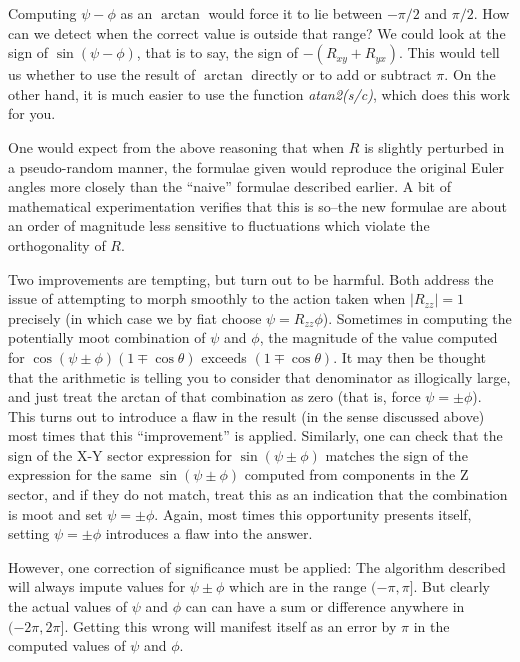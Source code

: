 \documentclass[twoside,12pt]{article}
\begin{document}
Computing $\psi - \phi $ as an $\arctan$ would force it to lie between $-\pi/2$
and $\pi/2$.  How can we detect when the correct value is outside that range?
We could look at the sign of $\sin (\psi - \phi)$, 
that is to say, the sign of $-(R_{xy} + R_{yx})$.  This would tell us
whether to use the result of $\arctan$ directly or to add or subtract $\pi$.
On the other hand, it is much easier to use the function {\em atan2(s/c)},
which does this work for you.

One would expect from the above reasoning that when $R$ is slightly perturbed
in a pseudo-random manner,
the formulae given would reproduce the original Euler angles more closely than 
the ``naive'' formulae described earlier.  A bit of mathematical experimentation
verifies that this is so--the new formulae are about an order of magnitude
less sensitive to fluctuations which violate the orthogonality of $R$.

Two improvements are tempting, but turn out to be harmful.  Both address the
issue of attempting to morph smoothly to the action taken when $|R_{zz}| = 1$
precisely (in which case we by fiat choose $\psi = R_{zz} \phi$).   Sometimes
in computing the potentially moot combination of $\psi$ and $\phi$, 
the magnitude of the value computed for 
$\cos (\psi \pm \phi) (1 \mp \cos \theta)$ exceeds $(1 \mp \cos \theta)$.  
It may then be thought that the arithmetic is telling you to consider that 
denominator as illogically large, and just treat the arctan of that 
combination as zero (that is, force $\psi = \pm \phi$).  This turns out to
introduce a flaw in the result (in the sense discussed above) most times that
this ``improvement'' is applied.  Similarly, one can check that the sign of the 
X-Y sector expression for $\sin(\psi \pm \phi)$ matches the sign of the
expression for the same $\sin(\psi \pm \phi)$ computed from components in the Z
sector, and if they do not match, treat this as an indication that the
combination is moot and set $\psi = \pm \phi$.  Again, most times this
opportunity presents itself, setting $\psi = \pm \phi$ introduces a flaw 
into the answer.  

However, one correction of significance must be applied:
The algorithm described will always impute values for $\psi \pm \phi$ 
which are in the range $(-\pi,\pi]$.  But clearly the actual values of 
$\psi$ and $\phi$ can can have a sum or difference anywhere in $(-2\pi,2\pi]$.
Getting this wrong will manifest itself as an error by $\pi$ in the
computed values of $\psi$ and $\phi$.
\end{document}
